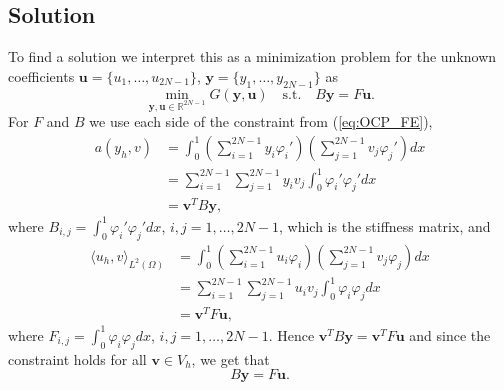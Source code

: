 \subsection{Solution}
To find a solution we interpret this as a minimization problem for the unknown coefficients $\mathbf{u} = \{u_1, \dots, u_{2N-1} \}$, $\mathbf{y} = \{y_1, \dots, y_{2N-1} \}$ as
\begin{equation}
    \label{eq:OCP_coeff}
    \min_{\mathbf{y,u} \in \mathds{R}^{2N-1}} G(\mathbf{y, u}) \quad \text{s.t.} \quad B\mathbf{y} = F\mathbf{u}.
\end{equation}
For $F$ and $B$ we use each side of the constraint from (\ref{eq:OCP_FE}), 
\begin{equation}
\begin{split}
    a(y_h, v) &= \int_0^1 \left( \sum_{i=1}^{2N-1} y_i \varphi_i'  \right) \left( \sum_{j=1}^{2N-1} v_j \varphi_j'\right)dx  \\
    & = \sum_{i=1}^{2N-1}\sum_{j=1}^{2N-1} y_i v_j\int_0^1  \varphi_i' \varphi_j' dx \\
    &= \mathbf{v}^T B \mathbf{y} ,
\end{split}
\end{equation}
where $B_{i,j} = \int_0^1 \varphi_i' \varphi_j'dx$,  $i,j = 1, \dots, 2N-1$, which is the stiffness matrix, and  
\begin{equation}
\begin{split}
    \langle u_h, v \rangle_{L^2(\Omega)} &= \int_0^1 \left( \sum_{i=1}^{2N-1} u_i \varphi_i \right) \left( \sum_{j=1}^{2N-1} v_j \varphi_j \right) dx \\
    &= \sum_{i=1}^{2N-1}\sum_{j=1}^{2N-1} u_i v_j\int_0^1  \varphi_i \varphi_j dx \\
    &= \mathbf{v}^T F \mathbf{u} , 
\end{split}
\end{equation}
 where $F_{i,j}=\int_0^1  \varphi_i \varphi_j dx$, $i,j = 1, \dots, 2N-1$.
Hence \( \mathbf{v}^T B \mathbf{y} = \mathbf{v}^T F \mathbf{u}  \) and
since the constraint holds for all $\mathbf{v} \in V_h$, we get that
\begin{equation}
  B\mathbf{y} = F \mathbf{u}.
\end{equation}


